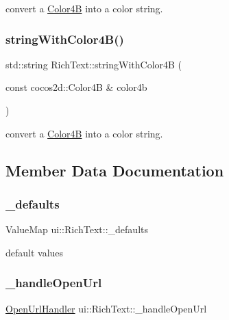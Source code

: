 convert a \hyperlink{structColor4B}{Color4B} into a color string. \mbox{\label{classui_1_1RichText_ae6ebbc92f1c67012b680ac70de932d0a}} 
\subsubsection{\texorpdfstring{string\+With\+Color4\+B()}{stringWithColor4B()}\hspace{0.1cm}{\footnotesize\ttfamily [2/2]}}
{\footnotesize\ttfamily std\+::string Rich\+Text\+::string\+With\+Color4B (\begin{DoxyParamCaption}\item[{const cocos2d\+::\+Color4B \&}]{color4b }\end{DoxyParamCaption})}

convert a \hyperlink{structColor4B}{Color4B} into a color string. 

\subsection{Member Data Documentation}
\mbox{\label{classui_1_1RichText_ad6f6ba7e12a897612068df6d93b1f9b6}} 
\subsubsection{\texorpdfstring{\+\_\+defaults}{\_defaults}}
{\footnotesize\ttfamily Value\+Map ui\+::\+Rich\+Text\+::\+\_\+defaults\hspace{0.3cm}{\ttfamily [protected]}}

default values \mbox{\label{classui_1_1RichText_adc716a3556a97f5b034caf78e8e30276}} 
\subsubsection{\texorpdfstring{\+\_\+handle\+Open\+Url}{\_handleOpenUrl}}
{\footnotesize\ttfamily \hyperlink{classui_1_1RichText_ad3631ae61d204f1d9576f5923bbd762e}{Open\+Url\+Handler} ui\+::\+Rich\+Text\+::\+\_\+handle\+Open\+Url\hspace{0.3cm}{\ttfamily [protected]}}

